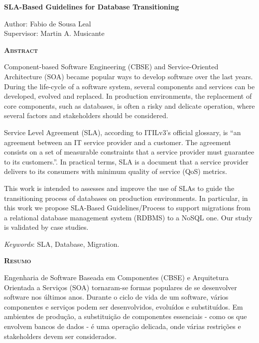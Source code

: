 \begin{center}
	{\Large{\textbf{SLA-Based Guidelines for Database Transitioning}}}
\end{center}

\vspace{1cm}

\begin{flushright}
	Author: Fabio de Sousa Leal\\
	Supervisor: Martin A. Musicante
\end{flushright}

\vspace{1cm}

\begin{center}
	\Large{\textsc{\textbf{Abstract}}}
\end{center}

\noindent Component-based Software Engineering (CBSE) and Service-Oriented Architecture (SOA) became  popular ways to develop software over the last years. During the life-cycle of a software system, several components and services can be developed, evolved and replaced. In production environments, the replacement of core components, such as databases, is often a risky and delicate operation, where several factors and stakeholders should be considered.

Service Level Agreement (SLA), according to ITILv3's official glossary, is ``an agreement between an IT service provider and a customer. The agreement consists on a set of measurable constraints that a service provider must guarantee to its customers.''. In practical terms, SLA is a document that a service provider delivers to its consumers with minimum quality of service (QoS) metrics.

This work is intended to assesses and improve the use of SLAs to guide the transitioning process of databases on production environments. In particular, in this work we propose SLA-Based Guidelines/Process to support migrations from a relational database management system (RDBMS) to a NoSQL one. Our study is validated by case studies.

\noindent\textit{Keywords}: SLA, Database, Migration.



\begin{center}
	\Large{\textsc{\textbf{Resumo}}}
\end{center}

Engenharia de Software Baseada em Componentes (CBSE) e Arquitetura Orientada a Servi\c{c}os (SOA) tornaram-se formas populares de se desenvolver software nos \'ultimos anos. Durante o ciclo de vida de um software, v\'arios componentes e servi\c{c}os podem ser desenvolvidos, evolu\'idos e substitu\'idos. Em ambientes de produ\c{c}\~ao, a substitui\c{c}\~ao de componentes essenciais - como os que envolvem bancos de dados - \'e uma opera\c{c}\~ao delicada, onde v\'arias restri\c{c}\~oes e stakeholders devem ser considerados.

